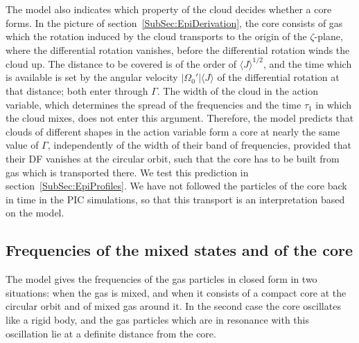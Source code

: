 The model also indicates which property of the cloud decides whether a core forms. In the picture of section~\ref{SubSec:EpiDerivation}, the core consists of gas which the rotation induced by the cloud transports to the origin of the $\zeta$-plane, where the differential rotation vanishes, before the differential rotation winds the cloud up. The distance to be covered is of the order of $\langle J\rangle^{1/2}$, and the time which is available is set by the angular velocity $|\Omega_0'|\langle J\rangle$ of the differential rotation at that distance; both enter through $\Gamma$. The width of the cloud in the action variable, which determines the spread of the frequencies and the time $\tau_1$ in which the cloud mixes, does not enter this argument. Therefore, the model predicts that clouds of different shapes in the action variable form a core at nearly the same value of $\Gamma$, independently of the width of their band of frequencies, provided that their DF vanishes at the circular orbit, such that the core has to be built from gas which is transported there. We test this prediction in section~\ref{SubSec:EpiProfiles}. We have not followed the particles of the core back in time in the PIC simulations, so that this transport is an interpretation based on the model.


\subsection{Frequencies of the mixed states and of the core}
\label{SubSec:EpiFrequencies}

The model gives the frequencies of the gas particles in closed form in two situations: when the gas is mixed, and when it consists of a compact core at the circular orbit and of mixed gas around it. In the second case the core oscillates like a rigid body, and the gas particles which are in resonance with this oscillation lie at a definite distance from the core.

